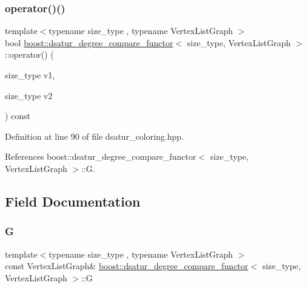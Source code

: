 \subsubsection{\texorpdfstring{operator()()}{operator()()}}
{\footnotesize\ttfamily template$<$typename size\+\_\+type , typename Vertex\+List\+Graph $>$ \\
bool \hyperlink{structboost_1_1dsatur__degree__compare__functor}{boost\+::dsatur\+\_\+degree\+\_\+compare\+\_\+functor}$<$ size\+\_\+type, Vertex\+List\+Graph $>$\+::operator() (\begin{DoxyParamCaption}\item[{size\+\_\+type}]{v1,  }\item[{size\+\_\+type}]{v2 }\end{DoxyParamCaption}) const\hspace{0.3cm}{\ttfamily [inline]}}



Definition at line 90 of file dsatur\+\_\+coloring.\+hpp.



References boost\+::dsatur\+\_\+degree\+\_\+compare\+\_\+functor$<$ size\+\_\+type, Vertex\+List\+Graph $>$\+::G.



\subsection{Field Documentation}
\mbox{\label{structboost_1_1dsatur__degree__compare__functor_ae524796a59fa34ed459bc7cdadfe3e2e}} 
\subsubsection{\texorpdfstring{G}{G}}
{\footnotesize\ttfamily template$<$typename size\+\_\+type , typename Vertex\+List\+Graph $>$ \\
const Vertex\+List\+Graph\& \hyperlink{structboost_1_1dsatur__degree__compare__functor}{boost\+::dsatur\+\_\+degree\+\_\+compare\+\_\+functor}$<$ size\+\_\+type, Vertex\+List\+Graph $>$\+::G\hspace{0.3cm}{\ttfamily [private]}}



